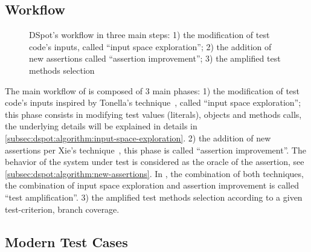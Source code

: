 \subsection{Workflow}
\label{subsec:dspot:algorithm:workflow}

\begin{figure}[h]
	\centering{}
	\caption{DSpot's workflow in three main steps: 1) the modification of test code's inputs, called ``input space exploration''; 2) the addition of new assertions called ``assertion improvement''; 3) the amplified test methods selection}
	\label{fig:dspot-workflow}
\end{figure}

The main workflow of \dspot is composed of 3 main phases:
1) the modification of test code's inputs inspired by Tonella's technique~\cite{tonella}, called ``input space exploration''; 
this phase consists in modifying test values (\eg literals), objects and methods calls, the underlying details will be explained in details in \autoref{subsec:dspot:algorithm:input-space-exploration}.
2) the addition of new assertions per Xie's technique~\cite{TaoXie2006}, this phase is called ``assertion improvement''.
The behavior of the system under test is considered as the oracle of the assertion, see \autoref{subsec:dspot:algorithm:new-assertions}.
In \dspot, the combination of both techniques, \ie the combination of input space exploration and assertion improvement is called ``test amplification''.
3) the amplified test methods selection according to a given test-criterion, \eg branch coverage.

\subsection{Modern Test Cases}
\label{subsec:dspot:algorithm:appliance-to-unit-test}

